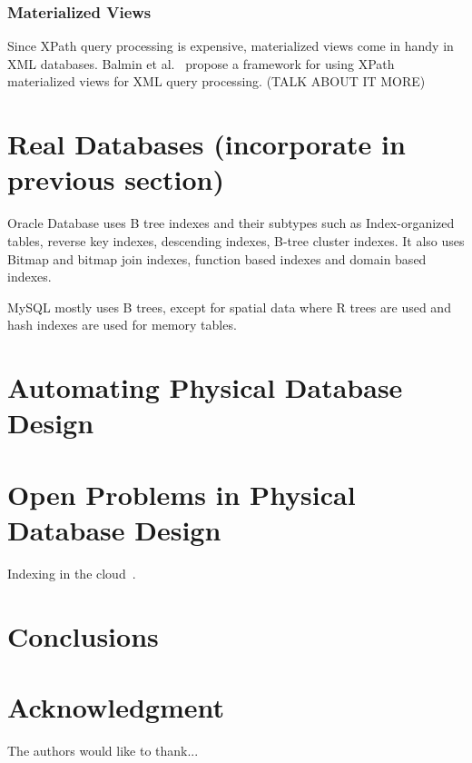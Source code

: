 \documentclass[12pt,a4paper]{article}
\begin{document}
\subsubsection{Materialized Views}

Since XPath query processing is expensive, materialized views come in handy in XML databases. Balmin et al.~\cite{balmin2004framework} propose a framework for using XPath materialized views for XML query processing. (TALK ABOUT IT MORE)

\section{Real Databases (incorporate in previous section)}

Oracle Database uses B tree indexes and their subtypes such as Index-organized tables, reverse key indexes, descending indexes, B-tree cluster indexes. It also uses Bitmap and bitmap join indexes, function based indexes and domain based indexes.

MySQL mostly uses B trees, except for spatial data where R trees are used and hash indexes are used for memory tables.

\section{Automating Physical Database Design}
\label{SEC-AUTO}

\section{Open Problems in Physical Database Design}
\label{SEC-OPEN}

Indexing in the cloud~\cite{wang2010indexing}.

\section{Conclusions}
\label{SEC-CONCL}
\section*{Acknowledgment}


The authors would like to thank...



%








\end{document}
